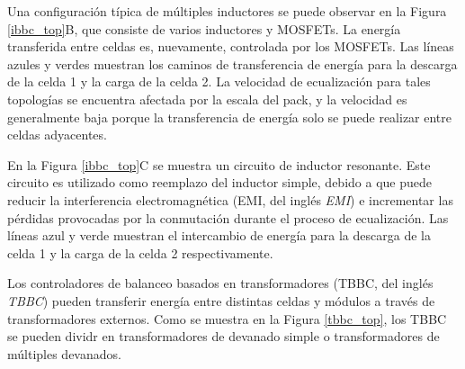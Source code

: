 \documentclass[10pt,a4paper]{article}
\newcounter{subsubsubsection}[subsubsection]
\begin{document}
Una configuraci\'on t\'ipica de m\'ultiples inductores se puede observar en la
Figura \ref{ibbc_top}B, que consiste de varios inductores y MOSFETs. La
energ\'ia transferida entre celdas es, nuevamente, controlada por los MOSFETs. 
Las líneas azules y verdes muestran los caminos de transferencia de 
energ\'ia para la descarga de la celda 1 y la carga de la celda 2. La velocidad 
de ecualizaci\'on para tales topolog\'ias se encuentra afectada por la escala 
del pack, y la velocidad es generalmente baja porque la transferencia de 
energ\'ia solo se puede realizar entre celdas adyacentes.

En la Figura \ref{ibbc_top}C se muestra un circuito de inductor resonante. Este
circuito es utilizado como reemplazo del inductor simple, debido a que puede
reducir la interferencia electromagn\'etica (\acrshort{EMI}, del ingl\'es
\emph{\acrlong{EMI}}) e incrementar las p\'erdidas provocadas por la
conmutaci\'on durante el proceso de ecualizaci\'on. Las líneas azul y verde
muestran el intercambio de energ\'ia para la descarga de la celda 1 y la carga
de la celda 2 respectivamente.




Los controladores de balanceo basados en transformadores (\acrshort{TBBC}, del
ingl\'es \emph{\acrlong{TBBC}}) pueden transferir energ\'ia entre distintas celdas y
m\'odulos a trav\'es de transformadores externos. Como se muestra en la Figura
\ref{tbbc_top}, los \acrshort{TBBC} se pueden dividr en transformadores de
devanado simple o transformadores de m\'ultiples devanados.
\end{document}
